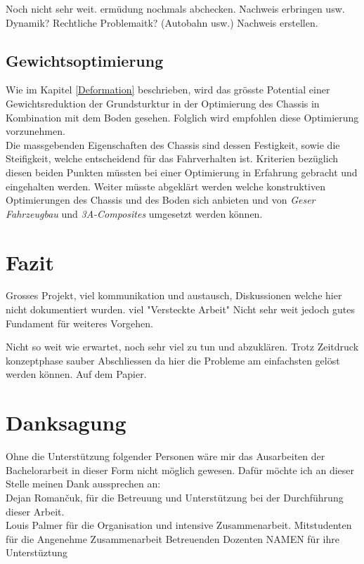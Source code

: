 Noch nicht sehr weit.
ermüdung nochmals abchecken. Nachweis erbringen usw.
Dynamik?
Rechtliche Problemaitk? (Autobahn usw.) Nachweis erstellen.

\subsection{Gewichtsoptimierung}
Wie im Kapitel \ref{Deformation} beschrieben, wird das grösste Potential einer Gewichtsreduktion der Grundsturktur in der Optimierung des Chassis in Kombination mit dem Boden gesehen. Folglich wird empfohlen diese Optimierung vorzunehmen.\\
Die massgebenden Eigenschaften des Chassis sind dessen Festigkeit, sowie die Steifigkeit, welche entscheidend für das Fahrverhalten ist. Kriterien bezüglich diesen beiden Punkten müssten bei einer Optimierung in Erfahrung gebracht und eingehalten werden. Weiter müsste abgeklärt werden welche konstruktiven Optimierungen des Chassis und des Boden sich anbieten und von \emph{Geser Fahrzeugbau} und \emph{3A-Composites} umgesetzt werden können.


\newpage

\section{Fazit}
Grosses Projekt, viel kommunikation und austausch, Diskussionen welche hier nicht dokumentiert wurden. viel "Versteckte Arbeit"
Nicht sehr weit jedoch gutes Fundament für weiteres Vorgehen.

Nicht so weit wie erwartet, noch sehr viel zu tun und abzuklären.
Trotz Zeitdruck konzeptphase sauber Abschliessen da hier die Probleme am einfachsten gelöst werden können. Auf dem Papier.



\newpage

\section{Danksagung}
Ohne die Unterstützung folgender Personen wäre mir das Ausarbeiten der Bachelorarbeit in dieser Form nicht möglich gewesen. Dafür möchte ich an dieser Stelle meinen Dank aussprechen an:\\
Dejan Roman\v{c}uk, für die Betreuung und Unterstützung bei der Durchführung dieser Arbeit.\\
Louis Palmer für die Organisation und intensive Zusammenarbeit.
Mitstudenten für die Angenehme Zusammenarbeit
Betreuenden Dozenten NAMEN für ihre Unterstüztung
\newpage
